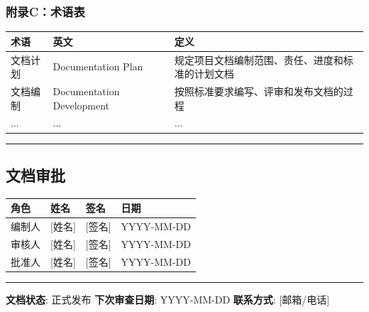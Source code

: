 \documentclass[12pt,a4paper]{article}
\numberwithin{equation}{section}  %
\begin{document}
\subsubsection{附录C：术语表}
\begin{longtable}{|p{4cm}|p{5cm}|p{5cm}|}
\hline
术语 & 英文 & 定义 \\
\hline
文档计划 & Documentation Plan & 规定项目文档编制范围、责任、进度和标准的计划文档 \\
文档编制 & Documentation Development & 按照标准要求编写、评审和发布文档的过程 \\
... & ... & ... \\
\hline
\end{longtable}

\hrule
\subsection{文档审批}
\begin{longtable}{|p{3cm}|p{4cm}|p{4cm}|p{3cm}|}
\hline
角色 & 姓名 & 签名 & 日期 \\
\hline
编制人 & [姓名] & [签名] & YYYY-MM-DD \\
审核人 & [姓名] & [签名] & YYYY-MM-DD \\
批准人 & [姓名] & [签名] & YYYY-MM-DD \\
\hline
\end{longtable}

\hrule
\textbf{文档状态}: 正式发布  
\textbf{下次审查日期}: YYYY-MM-DD  
\textbf{联系方式}: [邮箱/电话]
\end{document}
